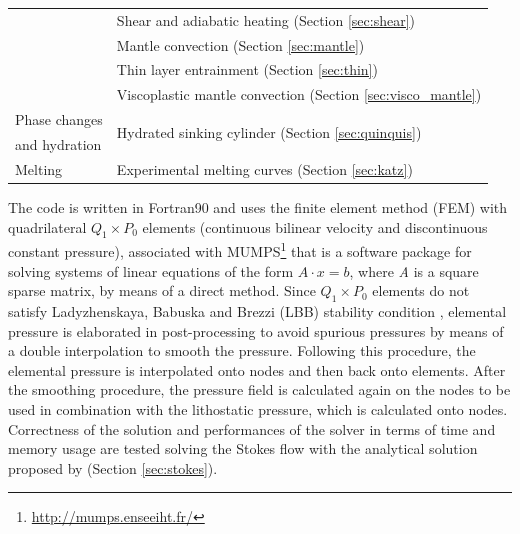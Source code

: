 \documentclass[hidelinks,10pt,a4paper]{article}
\begin{document}
\begin{table}[H]
\begin{tabular}{| l | l |}
    & Shear and adiabatic heating (Section \ref{sec:shear}) \\
    & Mantle convection (Section \ref{sec:mantle})   \\
    & Thin layer entrainment (Section \ref{sec:thin})   \\
    & Viscoplastic mantle convection (Section \ref{sec:visco_mantle})   \\
\hline
  Phase changes  & \multirow{2}{*}{Hydrated sinking cylinder (Section \ref{sec:quinquis})} \\
  and hydration  &  \\
\hline
  Melting & Experimental melting curves (Section \ref{sec:katz}) \\
\bottomrule
\end{tabular}
\label{tab:list}
\end{table}

The code is written in Fortran90 and uses the finite element method (FEM) with quadrilateral $Q_1 \times P_0$ elements (continuous bilinear velocity and
discontinuous constant pressure), associated with MUMPS\footnote{\url{http://mumps.enseeiht.fr/}} \citep{Amestoy2001,Amestoy2019} that is a software package
for solving systems of linear equations of the form $A \cdot x = b$, where \textit{A} is a square sparse matrix, by means of a direct method. Since
$Q_1 \times P_0$ elements do not satisfy Ladyzhenskaya, Babuska and Brezzi (LBB) stability condition \citep{Donea2003}, elemental pressure is elaborated
in post-processing to avoid spurious pressures by means of a double interpolation to smooth the pressure. Following this procedure, the elemental pressure
is interpolated onto nodes and then back onto elements. After the smoothing procedure, the pressure field is calculated again on the nodes to be used in
combination with the lithostatic pressure, which is calculated onto nodes. Correctness of the solution and performances of the solver in terms of time and
memory usage are tested solving the Stokes flow with the analytical solution proposed by \citet{Donea2003} (Section \ref{sec:stokes}).
\end{document}
